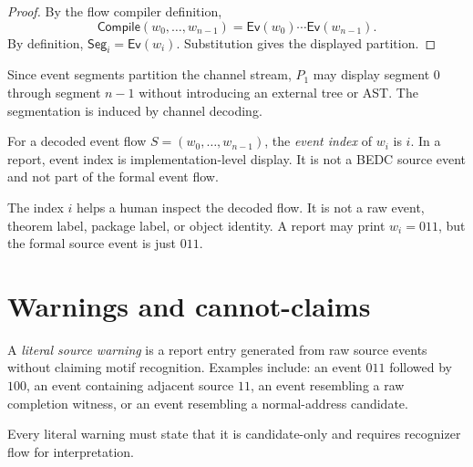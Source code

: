 \begin{proof}
By the flow compiler definition,
$$
  \mathsf{Compile}(w_0,\ldots,w_{n-1})
  =
  \mathsf{Ev}(w_0)\cdots\mathsf{Ev}(w_{n-1}).
$$
By definition, $\mathsf{Seg}_i=\mathsf{Ev}(w_i)$. Substitution gives the displayed partition.
\end{proof}

\begin{corollary}
\label{cor:source-report-may-display-segments}
Since event segments partition the channel stream, $P_1$ may display segment $0$ through segment $n-1$ without introducing an external tree or AST. The segmentation is induced by channel decoding.
\end{corollary}

\begin{definition}
\label{def:source-report-event-index}
For a decoded event flow $S=(w_0,\ldots,w_{n-1})$, the \emph{event index} of $w_i$ is $i$. In a report, event index is implementation-level display. It is not a BEDC source event and not part of the formal event flow.
\end{definition}

\begin{remark}
\label{rem:source-report-index-not-source-structure}
The index $i$ helps a human inspect the decoded flow. It is not a raw event, theorem label, package label, or object identity. A report may print $w_i=011$, but the formal source event is just $011$.
\end{remark}

\section{Warnings and cannot-claims}
\label{sec:source-report-warnings-cannot-claims}

\begin{definition}
\label{def:source-report-literal-warning}
A \emph{literal source warning} is a report entry generated from raw source events without claiming motif recognition. Examples include: an event $011$ followed by $100$, an event containing adjacent source $11$, an event resembling a raw completion witness, or an event resembling a normal-address candidate.

Every literal warning must state that it is candidate-only and requires recognizer flow for interpretation.
\end{definition}

